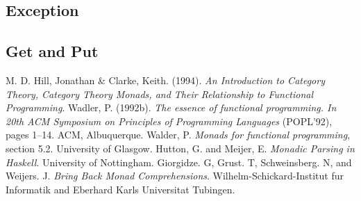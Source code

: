 \documentclass[a4paper, onecolumn]{article}
\begin{document}
    
    \subsection{Exception}
    
    \subsection{Get and Put}
        
    
    
    
    \begin{thebibliography}{9}
    M. D. Hill, Jonathan & Clarke, Keith. (1994). \textit{An Introduction to Category Theory, Category Theory Monads, and Their Relationship to Functional Programming}.
    Wadler, P. (1992b). \textit{The essence of functional programming. In
    20th ACM Symposium on Principles of Programming Languages}
    (POPL’92), pages 1–14. ACM, Albuquerque.
    Walder, P. \textit{Monads for functional programming}, section 5.2. University of Glasgow. 
    Hutton, G. and Meijer, E. \textit{Monadic Parsing in Haskell}. University of Nottingham.
    Giorgidze. G, Grust. T, Schweinsberg. N, and Weijers. J. \textit{Bring Back Monad Comprehensions}. Wilhelm-Schickard-Institut fur Informatik and Eberhard Karls Universitat Tubingen.
    \end{thebibliography}
    
\end{document}
